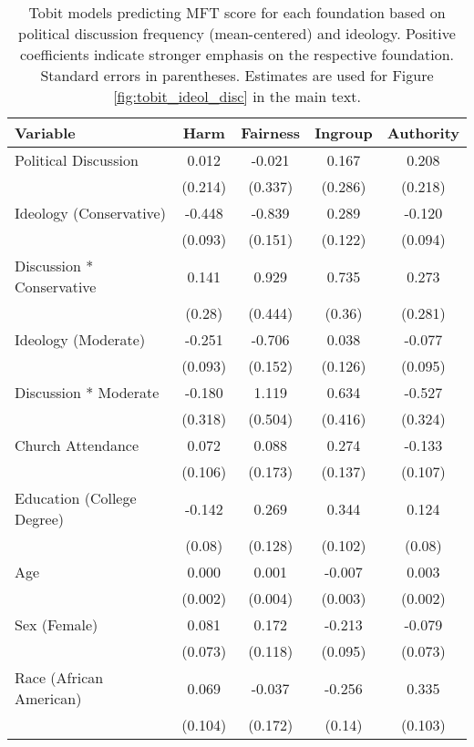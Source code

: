 \begin{table}[ht]
\centering
\caption{Tobit models predicting MFT score for each foundation based 
           on political discussion frequency (mean-centered) and ideology. Positive coefficients 
           indicate stronger emphasis on the respective foundation. Standard errors in parentheses. 
           Estimates are used for Figure \ref{fig:tobit_ideol_disc} in the main text.} 
\label{tab:tobit_ideol_disc}
\begingroup\footnotesize
\begin{tabular}{lcccc}
  \hline
Variable & Harm & Fairness & Ingroup & Authority \\ 
  \hline
Political Discussion &  0.012 & -0.021 &  0.167 &  0.208 \\ 
   & (0.214) & (0.337) & (0.286) & (0.218) \\ 
  Ideology (Conservative) & -0.448 & -0.839 &  0.289 & -0.120 \\ 
   & (0.093) & (0.151) & (0.122) & (0.094) \\ 
  Discussion * Conservative &  0.141 &  0.929 &  0.735 &  0.273 \\ 
   & (0.28) & (0.444) & (0.36) & (0.281) \\ 
  Ideology (Moderate) & -0.251 & -0.706 &  0.038 & -0.077 \\ 
   & (0.093) & (0.152) & (0.126) & (0.095) \\ 
  Discussion * Moderate & -0.180 &  1.119 &  0.634 & -0.527 \\ 
   & (0.318) & (0.504) & (0.416) & (0.324) \\ 
  Church Attendance &  0.072 &  0.088 &  0.274 & -0.133 \\ 
   & (0.106) & (0.173) & (0.137) & (0.107) \\ 
  Education (College Degree) & -0.142 &  0.269 &  0.344 &  0.124 \\ 
   & (0.08) & (0.128) & (0.102) & (0.08) \\ 
  Age &  0.000 &  0.001 & -0.007 &  0.003 \\ 
   & (0.002) & (0.004) & (0.003) & (0.002) \\ 
  Sex (Female) &  0.081 &  0.172 & -0.213 & -0.079 \\ 
   & (0.073) & (0.118) & (0.095) & (0.073) \\ 
  Race (African American) &  0.069 & -0.037 & -0.256 &  0.335 \\ 
   & (0.104) & (0.172) & (0.14) & (0.103) \\ 

\end{tabular}
\end{table}
